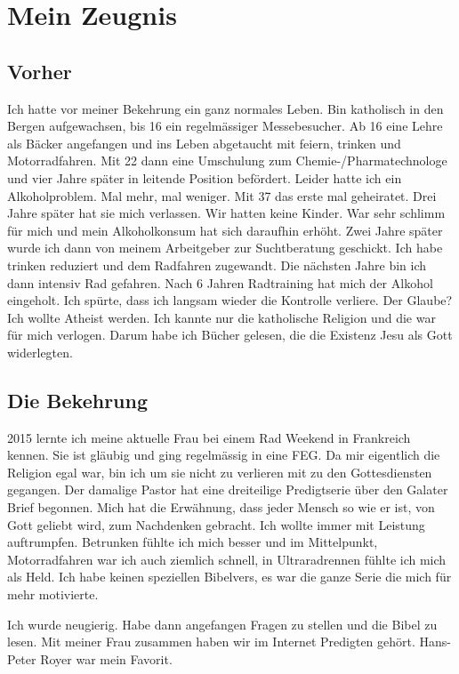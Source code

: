 \documentclass{../../inc/mybib}
\begin{document}
\section*{Mein Zeugnis}
\subsection*{Vorher}
Ich hatte vor meiner Bekehrung ein ganz normales Leben. Bin katholisch in den Bergen aufgewachsen, bis 16 ein regelmässiger Messebesucher. Ab 16 eine Lehre als Bäcker angefangen und ins Leben abgetaucht mit feiern, trinken und Motorradfahren. Mit 22 dann eine Umschulung zum Chemie-/Pharmatechnologe und vier Jahre später in leitende Position befördert. Leider hatte ich ein Alkoholproblem. Mal mehr, mal weniger. Mit 37 das erste mal geheiratet. Drei Jahre später hat sie mich verlassen. Wir hatten keine Kinder. War sehr schlimm für mich und mein Alkoholkonsum hat sich daraufhin erhöht. Zwei Jahre später wurde ich dann von meinem Arbeitgeber zur Suchtberatung geschickt. Ich habe trinken reduziert und dem Radfahren zugewandt. Die nächsten Jahre bin ich dann intensiv Rad gefahren. Nach 6 Jahren Radtraining hat mich der Alkohol eingeholt. Ich spürte, dass ich langsam wieder die Kontrolle verliere. Der Glaube? Ich wollte Atheist werden. Ich kannte nur die katholische Religion und die war für mich verlogen. Darum habe ich Bücher gelesen, die die Existenz Jesu als Gott widerlegten.
\subsection*{Die Bekehrung}
2015 lernte ich meine aktuelle Frau bei einem Rad Weekend in Frankreich kennen. Sie ist gläubig und ging regelmässig in eine FEG. Da mir eigentlich die Religion egal war, bin ich um sie nicht zu verlieren mit zu den Gottesdiensten gegangen. Der damalige Pastor hat eine dreiteilige Predigtserie über den Galater Brief begonnen. Mich hat die Erwähnung, dass jeder Mensch so wie er ist, von Gott geliebt wird, zum Nachdenken gebracht. Ich wollte immer mit Leistung auftrumpfen. Betrunken fühlte ich mich besser und im Mittelpunkt, Motorradfahren war ich auch ziemlich schnell, in Ultraradrennen fühlte ich mich als Held. Ich habe keinen speziellen Bibelvers, es war die ganze Serie die mich für mehr motivierte.

Ich wurde neugierig. Habe dann angefangen Fragen zu stellen und die Bibel zu lesen. Mit meiner Frau zusammen haben wir im Internet Predigten gehört. Hans-Peter Royer war mein Favorit.
\end{document}
